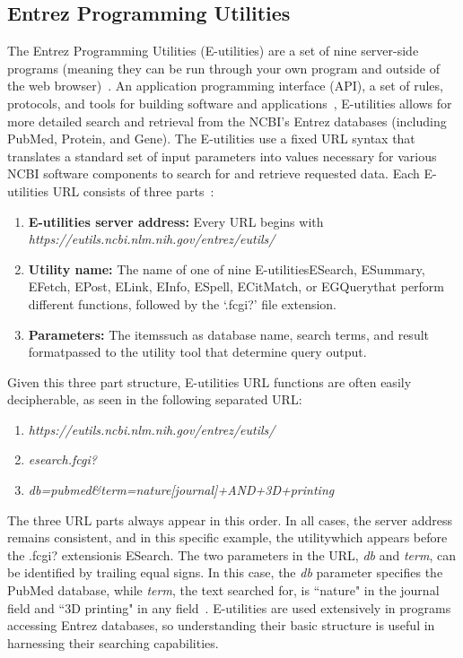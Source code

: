 \documentclass{IEEEtran}
\begin{document}
	\subsection{Entrez Programming Utilities}
	The Entrez Programming Utilities (E-utilities) are a set of nine server-side programs (meaning they can be run through your own program and outside of the web browser)~\cite{eutilities}. An application programming interface (API), a set of rules, protocols, and tools for building software and applications~\cite{eutils}, E-utilities allows for more detailed search and retrieval from the NCBI's Entrez databases (including PubMed, Protein, and Gene).  The E-utilities use a fixed URL syntax that translates a standard set of input parameters into values necessary for various NCBI software components to search for and retrieve requested data.  Each E-utilities URL consists of three parts~\cite{eutils}:
	\begin{enumerate}
		\item \textbf{E-utilities server address:} Every URL begins with \textit{https://eutils.ncbi.nlm.nih.gov/entrez/eutils/}
		\item \textbf{Utility name:} The name of one of nine E-utilities\textemdash ESearch, ESummary, EFetch, EPost, ELink, EInfo, ESpell, ECitMatch, or EGQuery\textemdash that perform different functions, followed by the `.fcgi?' file extension.
		\item \textbf{Parameters:} The items\textemdash such as database name, search terms, and result format\textemdash passed to the utility tool that determine query output.
	\end{enumerate}
	
	Given this three part structure, E-utilities URL functions are often easily decipherable, as seen in the following separated URL: 
	\begin{enumerate}
		\item \textit{https://eutils.ncbi.nlm.nih.gov/entrez/eutils/}
		\item \textit{esearch.fcgi?}
		\item \textit{db=pubmed\&term=nature[journal]+AND+3D+printing}
	\end{enumerate}
	The three URL parts always appear in this order.  In all cases, the server address remains consistent, and in this specific example, the utility\textemdash which appears before the .fcgi? extension\textemdash is ESearch.  The two parameters in the URL, \textit{db} and \textit{term}, can be identified by trailing equal signs.  In this case, the \textit{db} parameter specifies the PubMed database, while \textit{term}, the text searched for, is ``nature" in the journal field and ``3D printing" in any field~\cite{eutils}.  E-utilities are used extensively in programs accessing Entrez databases, so understanding their basic structure is useful in harnessing their searching capabilities.    
	
\end{document}
